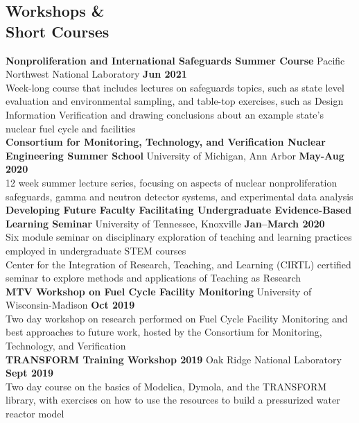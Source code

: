 \documentclass[margin,line]{resume}
\begin{document}
\begin{resume}
    \section{\mysidestyle Workshops \&\\Short Courses}
    \textbf{Nonproliferation and International Safeguards Summer Course} Pacific Northwest National Laboratory \hfill \textbf{Jun 2021} \\
    Week-long course that includes lectures on safeguards topics, such as state level evaluation and environmental sampling, and 
    table-top exercises, such as Design Information Verification and drawing conclusions about an example state's nuclear 
    fuel cycle and facilities \\
    \textbf{Consortium for Monitoring, Technology, and Verification Nuclear Engineering Summer School} University of Michigan, Ann Arbor \hfill \textbf{May-Aug 2020} \\
    12 week summer lecture series, focusing on aspects of nuclear nonproliferation safeguards, gamma and neutron detector systems, and experimental data analysis \\
    \textbf{Developing Future Faculty Facilitating Undergraduate Evidence-Based Learning Seminar} University of Tennessee, Knoxville \hfill \textbf{Jan--March 2020} \\
    Six module seminar on disciplinary exploration of teaching and learning practices employed in undergraduate STEM courses \\
    Center for the Integration of Research, Teaching, and Learning (CIRTL) certified seminar to explore methods and applications of Teaching as Research\\
    \textbf{MTV Workshop on Fuel Cycle Facility Monitoring} University of Wisconsin-Madison \hfill \textbf{Oct 2019} \\
    Two day workshop on research performed on Fuel Cycle Facility Monitoring and best approaches to future work, hosted by the Consortium for Monitoring, Technology, and Verification \\
    \textbf{TRANSFORM Training Workshop 2019} Oak Ridge National Laboratory \hfill \textbf{Sept 2019} \\
    Two day course on the basics of Modelica, Dymola, and the TRANSFORM library, with exercises on how to use the resources to build a pressurized water reactor model \\

\end{resume}
\end{document}
